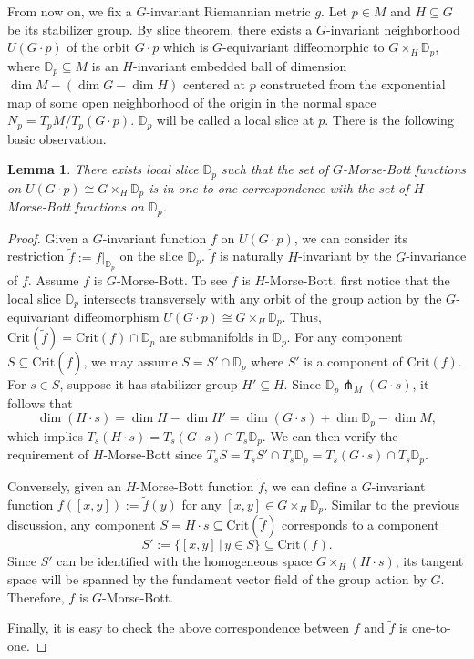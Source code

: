 \documentclass[11pt]{amsart}
\newtheorem{lemma}[theorem]{Lemma}
\theoremstyle{definition}
\numberwithin{equation}{subsection}
\begin{document}
From now on, we fix a $G$-invariant Riemannian metric $g$. Let $p\in M$ and $H\subseteq G$ be its stabilizer group. By slice theorem, there exists a $G$-invariant neighborhood $U(G\cdot p)$ of the orbit $G\cdot p$ which is $G$-equivariant diffeomorphic to $G\times_H \mathbb{D}_p$, where $\mathbb{D}_p\subseteq M$ is an $H$-invariant embedded ball of dimension $\dim M-(\dim G-\dim H)$ centered at $p$ constructed from the exponential map of some open neighborhood of the origin in the normal space $N_p=T_pM/T_p(G\cdot p)$. $\mathbb{D}_p$ will be called a local slice at $p$. There is the following basic observation.

\begin{lemma}\label{lem:correspondence}
   There exists local slice $\mathbb{D}_p$ such that the set of $G$-Morse-Bott functions on $U(G\cdot p)\cong G\times_H\mathbb{D}_p$ is in one-to-one correspondence with the set of $H$-Morse-Bott functions on $\mathbb{D}_p$.
\end{lemma}
\begin{proof}
Given a $G$-invariant function $f$ on $U(G\cdot p)$, we can consider its restriction $\tilde{f}:=f|_{\mathbb{D}_p}$ on the slice $\mathbb{D}_p$. $\tilde{f}$ is naturally $H$-invariant by the $G$-invariance of $f$. Assume $f$ is $G$-Morse-Bott. To see $\tilde{f}$ is $H$-Morse-Bott, first notice that the local slice $\mathbb{D}_p$ intersects transversely with any orbit of the group action by the $G$-equivariant diffeomorphism $U(G\cdot p)\cong G\times_H\mathbb{D}_p$. Thus, $\text{Crit}(\tilde{f})=\text{Crit}(f)\cap\mathbb{D}_p$ are submanifolds in $\mathbb{D}_p$. For any component $S\subseteq \text{Crit}(\tilde{f})$, we may assume $S=S'\cap \mathbb{D}_p$ where $S'$ is a component of $\text{Crit}(f)$. For $s\in S$, suppose it has stabilizer group $H'\subseteq H$. Since $\mathbb{D}_p\pitchfork_M(G\cdot s)$, it follows that \[\dim (H\cdot s)=\dim H-\dim H'=\dim(G\cdot s)+\dim \mathbb{D}_p-\dim M,\] which implies $T_s(H\cdot s)=T_s(G\cdot s)\cap T_s\mathbb{D}_p$. We can then verify the requirement of $H$-Morse-Bott since $T_sS=T_sS'\cap T_s\mathbb{D}_p=T_s(G\cdot s)\cap T_s\mathbb{D}_p$.


Conversely, given an $H$-Morse-Bott function $\tilde{f}$, we can define a $G$-invariant function $f([x,y]):=\tilde{f}(y)$ for any $[x,y]\in G\times_H \mathbb{D}_p$. Similar to the previous discussion, any component $S=H\cdot s\subseteq \text{Crit}(\tilde{f})$ corresponds to a component \[S':=\{[x,y]\,|\,y\in S\}\subseteq \text{Crit}(f).\] 
Since $S'$ can be identified with the homogeneous space $ G\times _H(H\cdot s)$, its tangent space will be spanned by the fundament vector field of the group action by $G$. Therefore, $f$ is $G$-Morse-Bott.

Finally, it is easy to check the above correspondence between $f$ and $\tilde{f}$ is one-to-one.
\end{proof}
\end{document}
